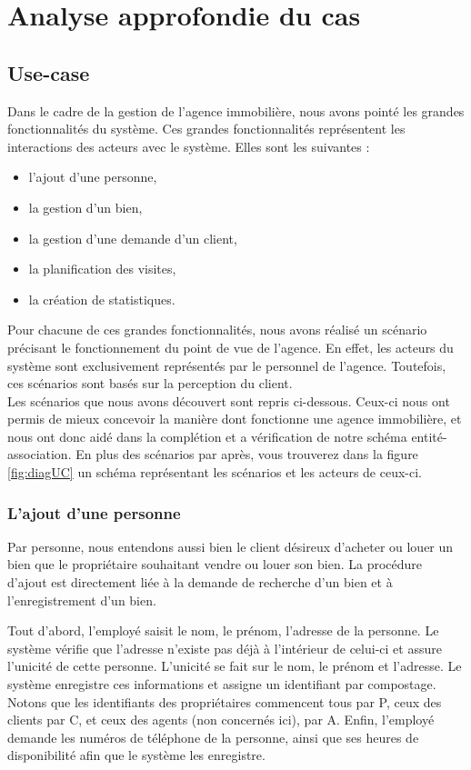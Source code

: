 \section{Analyse approfondie du cas}

\subsection{Use-case}
Dans le cadre de la gestion de l'agence immobilière, nous avons pointé les grandes fonctionnalités du système. Ces grandes fonctionnalités représentent les interactions des acteurs avec le système.
Elles sont les suivantes :
\begin{itemize}
	\item l'ajout d'une personne,
	\item la gestion d'un bien,
	\item la gestion d'une demande d'un client,
	\item la planification des visites,
	\item la création de statistiques.
\end{itemize}
Pour chacune de ces grandes fonctionnalités, nous avons réalisé un scénario précisant le fonctionnement du point de vue de l'agence. En effet, les acteurs du système sont exclusivement représentés par le personnel de l'agence.
Toutefois, ces scénarios sont basés sur la perception du client.\\

Les scénarios que nous avons découvert sont repris ci-dessous. Ceux-ci nous ont permis de mieux concevoir la manière dont fonctionne une agence immobilière, et nous ont donc aidé dans la complétion et a vérification de notre schéma entité-association. En plus des scénarios par après, vous trouverez dans la figure \ref{fig:diagUC} un schéma représentant les scénarios et les acteurs de ceux-ci.

\subsubsection{L'ajout d'une personne}
Par personne, nous entendons aussi bien le client désireux d'acheter ou louer un bien que le propriétaire souhaitant vendre ou louer son bien.
La procédure d'ajout est directement liée à la demande de recherche d'un bien et à l'enregistrement d'un bien.

Tout d'abord, l'employé saisit le nom, le prénom, l'adresse de la personne.
Le système vérifie que l'adresse n'existe pas déjà à l'intérieur de celui-ci et assure l'unicité de cette personne. L'unicité se fait sur le nom, le prénom et l'adresse.
Le système enregistre ces informations et assigne un identifiant par compostage. Notons que les identifiants des propriétaires commencent tous par P, ceux des clients par C, et ceux des agents (non concernés ici), par A.
Enfin, l'employé demande les numéros de téléphone de la personne, ainsi que ses heures de disponibilité afin que le système les enregistre.

